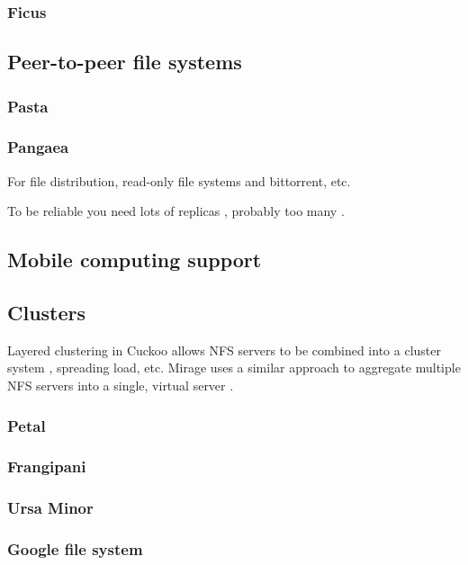 \subsubsection{Ficus}
\cite{popek}

\subsection{Peer-to-peer file systems}
\subsubsection{Pasta}
\cite{moreton}
\subsubsection{Pangaea}
\cite{saito02}
\cite{stein02}

For file distribution, read-only file systems \cite{fu} and bittorrent, etc.

To be reliable you need lots of replicas \cite{rabin}, probably too many \cite{blake}.

\subsection{Mobile computing support}
\cite{kim}\cite{mummert}\cite{sobti}

\subsection{Clusters}

Layered clustering in Cuckoo allows NFS servers to be combined into a cluster system \cite{klosterman}, spreading load, etc. Mirage uses a similar approach to aggregate multiple NFS servers into a single, virtual server \cite{baker02}.

\subsubsection{Petal}
\cite{lee95,lee96}
\subsubsection{Frangipani}
\cite{thekkath}
\subsubsection{Ursa Minor}
\cite{abd-el-malek}
\subsubsection{Google file system}
\cite{ghemawat}
